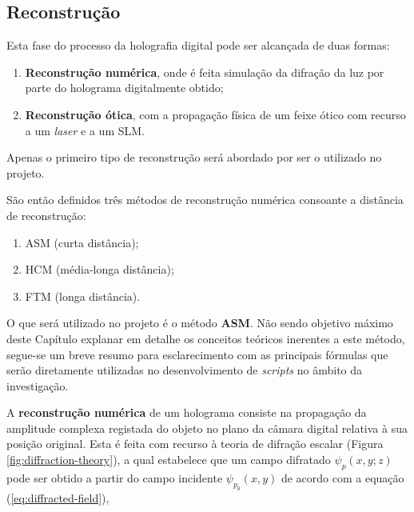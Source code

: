 \subsection{Reconstrução}
\label{ssec::estado-arte:holograma:reconst}

Esta fase do processo da holografia digital pode ser alcançada de duas formas\cite{Image2018}:
\begin{enumerate}
  \item \textbf{Reconstrução numérica}, onde é feita simulação da difração da luz por parte do holograma digitalmente obtido;
  \item \textbf{Reconstrução ótica}, com a propagação física de um feixe ótico com recurso a um \textit{laser} e a um \ac{SLM}.
\end{enumerate}

Apenas o primeiro tipo de reconstrução será abordado por ser o utilizado no projeto.

São então definidos três métodos de reconstrução numérica consoante a distância de reconstrução\cite{Image2018}:
\begin{enumerate}
  \item \ac{ASM} (curta distância);
  \item \ac{HCM} (média-longa distância);
  \item \ac{FTM} (longa distância).
\end{enumerate}

O que será utilizado no projeto é o método \textbf{\ac{ASM}}. Não sendo objetivo máximo deste Capítulo explanar em detalhe os conceitos teóricos inerentes a este método, segue-se um breve resumo para esclarecimento com as principais fórmulas que serão diretamente utilizadas no desenvolvimento de \textit{scripts} no âmbito da investigação.


A \textbf{reconstrução numérica} de um holograma consiste na propagação da amplitude complexa registada do objeto no plano da câmara digital relativa à sua posição original. Esta é feita com recurso à teoria de difração escalar (Figura \ref{fig:diffraction-theory})\cite{Image2018}, a qual estabelece que um campo difratado $\psi_p(x,y;z)$ pode ser obtido a partir do campo incidente $\psi_{p_0}(x,y)$ de acordo com a equação (\ref{eq:diffracted-field})\cite{Poon2014},


